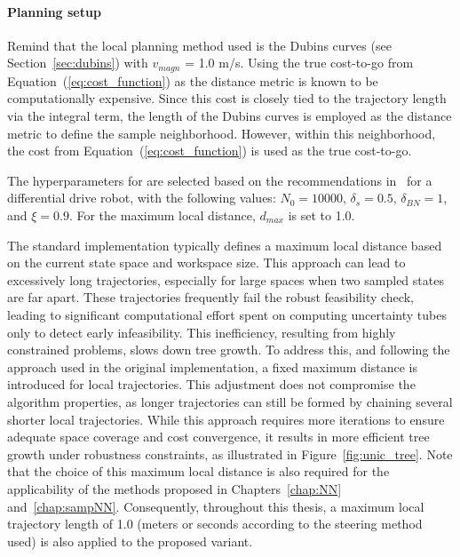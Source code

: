 \paragraph{Planning setup}

Remind that the local planning method used is the Dubins curves (see Section~\ref{sec:dubins}) with $v_{magn}$ = 1.0 m/s. 
Using the true cost-to-go from Equation~(\ref{eq:cost_function}) as the distance metric is known to be computationally expensive. 
Since this cost is closely tied to the trajectory length via the integral term, the length of the Dubins curves is employed as the distance metric to define the sample neighborhood. 
However, within this neighborhood, the cost from Equation~(\ref{eq:cost_function}) is used as the true cost-to-go.

The hyperparameters for  are selected based on the recommendations in~\cite{cSST} for a differential drive robot, with the following values: $N_0 = 10000$, $\delta_s = 0.5$, $\delta_{BN} = 1$, and $\xi = 0.9$.
For the maximum local distance, $d_{max}$ is set to 1.0.

The standard   implementation typically defines a maximum local distance based on the current state space and workspace size.
This approach can lead to excessively long trajectories, especially for large spaces when two sampled states are far apart.
These trajectories frequently fail the robust feasibility check, leading to significant computational effort spent on computing uncertainty tubes only to detect early infeasibility. 
This inefficiency, resulting from highly constrained problems, slows down tree growth.
To address this, and following the approach used in the original  implementation, a fixed maximum distance is introduced for local trajectories. 
This adjustment does not compromise the algorithm properties, as longer trajectories can still be formed by chaining several shorter local trajectories. 
While this approach requires more iterations to ensure adequate space coverage and cost convergence, it results in more efficient tree growth under robustness constraints, as illustrated in Figure~\ref{fig:unic_tree}.
Note that the choice of this maximum local distance is also required for the applicability of the methods proposed in Chapters~\ref{chap:NN} and~\ref{chap:sampNN}.
Consequently, throughout this thesis, a maximum local trajectory length of 1.0 (meters or seconds according to the steering method used) is also applied to the proposed  variant.

